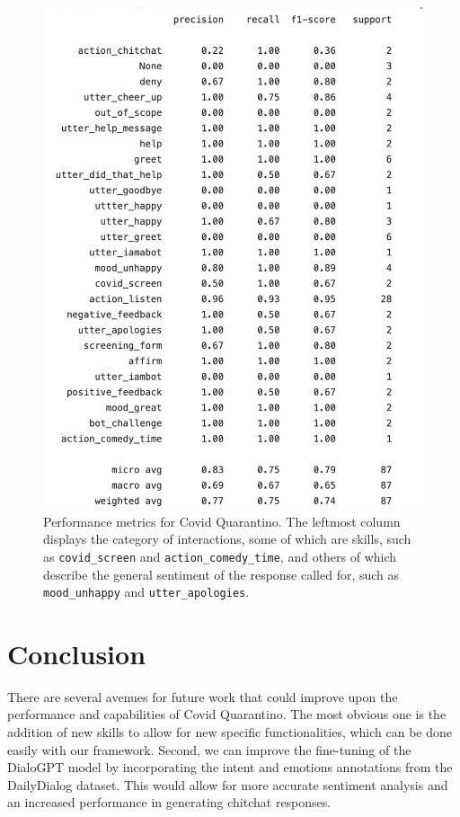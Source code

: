 \documentclass[11pt,a4paper]{article}
\begin{document}
\begin{figure}
\includegraphics[scale=0.5]{evaluation_metrics.png}
\caption{Performance metrics for Covid Quarantino. The leftmost column displays the category of interactions, some of which are skills, such as \texttt{covid\_screen} and \texttt{action\_comedy\_time}, and others of which describe the general sentiment of the response called for, such as \texttt{mood\_unhappy} and \texttt{utter\_apologies}.}
\end{figure}


\section{Conclusion}

There are several avenues for future work that could improve upon the performance and capabilities of Covid Quarantino. The most obvious one is the addition of new skills to allow for new specific functionalities, which can be done easily with our framework. Second, we can improve the fine-tuning of the DialoGPT model by incorporating the intent and emotions annotations from the DailyDialog dataset. This would allow for more accurate sentiment analysis and an increased performance in generating chitchat responses.
\end{document}
